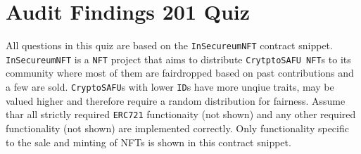 \section{Audit Findings 201 Quiz}

All questions in this quiz are based on the \verb|InSecureumNFT| contract snippet.
\verb|InSecureumNFT| is a \verb|NFT| project that aims to distribute \verb|CrytptoSAFU NFT|s to its community where most of them are fairdropped based on past contributions and a few are sold.
\verb|CryptoSAFU|s with lower \verb|ID|s have more unqiue traits, may be valued higher and therefore require a random distribution for fairness.
Assume thar all strictly required \verb|ERC721| functionaity (not shown) and any other required functionality (not shown) are implemented correctly.
Only functionality specific to the sale and minting of NFTs is shown in this contract snippet.


